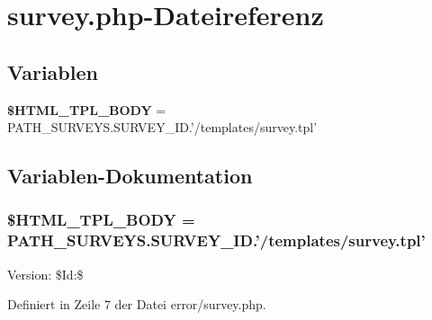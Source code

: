 \section{survey.php-Dateireferenz}
\label{error_2survey_8php}
\subsection*{Variablen}
\begin{CompactItemize}
\item 
{\bf \$HTML\_\-TPL\_\-BODY} = PATH\_\-SURVEYS.SURVEY\_\-ID.'/templates/survey.tpl'
\end{CompactItemize}


\subsection{Variablen-Dokumentation}
\subsubsection{\setlength{\rightskip}{0pt plus 5cm}\$HTML\_\-TPL\_\-BODY = PATH\_\-SURVEYS.SURVEY\_\-ID.'/templates/survey.tpl'}\label{error_2survey_8php_132a7bf90078fd9ad70b6057c8c2682a}


\begin{Desc}
\item[Version:]\$Id:\$ \end{Desc}


Definiert in Zeile 7 der Datei error/survey.php.